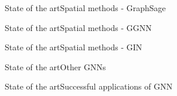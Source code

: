 \documentclass[xcolor=table]{beamer}
\begin{document}
\begin{frame}{State of the art}{Spatial methods - GraphSage}


\end{frame}



\begin{frame}{State of the art}{Spatial methods - GGNN}


\end{frame}





\begin{frame}{State of the art}{Spatial methods - GIN}


\end{frame}


\begin{frame}{State of the art}{Other GNNs}

\end{frame}


\begin{frame}{State of the art}{Successful applications of GNN}

\end{frame}
\end{document}

